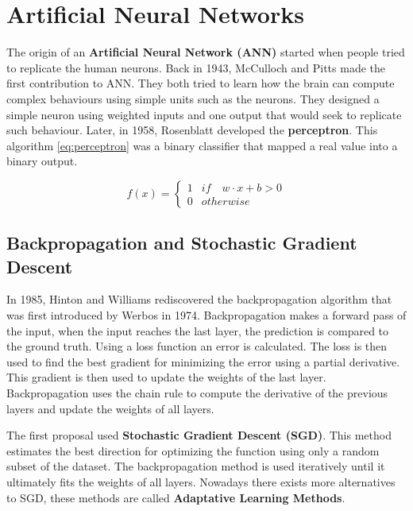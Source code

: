 \section{Artificial Neural Networks}

The origin of an \textbf{Artificial Neural Network (ANN)} started when people tried to replicate the human neurons. Back in 1943, McCulloch and Pitts \cite{Mcculloch1990AACTIVITY} made the first contribution to ANN. They both tried to learn how the brain can compute complex behaviours using simple units such as the neurons. They designed a simple neuron using weighted inputs and one output that would seek to replicate such behaviour. Later, in 1958, Rosenblatt \cite{RosenblattTHEBRAIN} developed the \textbf{perceptron}.  This algorithm \ref{eq:perceptron} was a binary classifier that mapped a real value into a binary output.

\begin{equation} \label{eq:perceptron}
  f(x) = \left\{
  \begin{matrix}
    1 & if \quad w \cdot x + b > 0 \\ 
    0 & otherwise
  \end{matrix}
  \right.
\end{equation}

\subsection{Backpropagation and Stochastic Gradient Descent}

In 1985, Hinton and Williams \cite{Rumelhart1986LearningPropagation} rediscovered the backpropagation algorithm that was first introduced by Werbos \cite{Werbos1974BeyondSciences} in 1974. Backpropagation makes a forward pass of the input, when the input reaches the last layer, the prediction is compared to the ground truth. Using a loss function an error is calculated. The loss is then used to find the best gradient for minimizing the error using a partial derivative. This gradient is then used to update the weights of the last layer. Backpropagation uses the chain rule to compute the derivative of the previous layers and update the weights of all layers.

The first proposal used \textbf{Stochastic Gradient Descent (SGD)}. This method estimates the best direction for optimizing the function using only a random subset of the dataset. The backpropagation method is used iteratively until it ultimately fits the weights of all layers. Nowadays there exists more alternatives to SGD, these methods are called \textbf{Adaptative Learning Methods}. 

